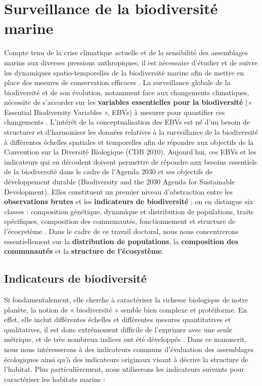 \section{Surveillance de la biodiversité marine}\label{intro.2}

Compte tenu de la crise climatique actuelle et de la sensibilité des assemblages marins aux diverses pressions anthropiques, il est nécessaire d’étudier et de suivre les dynamiques spatio-temporelles de la biodiversité marine afin de mettre en place des mesures de conservation efficaces \citep{magris_integrating_2014, klein_shortfalls_2015}. La surveillance globale de la biodiversité et de son évolution, notamment face aux changements climatiques, nécessite de s’accorder sur les \textbf{variables essentielles pour la biodiversité} (« Essential Biodiversity Variables », EBVs) à mesurer pour quantifier ces changements \citep{pereira_essential_2013, navarro_monitoring_2017, schmeller_operational_2017, haase_next_2018, kissling_building_2018}. L’intérêt de la conceptualisation des EBVs est né d’un besoin de structurer et d’harmoniser les données relatives à la surveillance de la biodiversité à différentes échelles spatiales et temporelles \citep{kissling_building_2018} afin de répondre aux objectifs de la Convention sur la Diversité Biologique (CDB 2010). Aujourd’hui, ces EBVs et les indicateurs qui en découlent doivent permettre de répondre aux besoins essentiels de la biodiversité dans le cadre de l’Agenda 2030 et ses objectifs de développement durable (Biodiversity and the 2030 Agenda for Sustainable Development). Elles constituent un premier niveau d’abstraction entre les \textbf{observations brutes} et les \textbf{indicateurs de biodiversité} ; on en distingue six classes : composition génétique, dynamique et distribution de populations, traits spécifiques, composition des communautés, fonctionnement et structure de l’écosystème \citep{pereira_essential_2013}. Dans le cadre de ce travail doctoral, nous nous concentrerons essentiellement sur la \textbf{distribution de populations}, la \textbf{composition des communautés} et la \textbf{structure de l’écosystème}.

\subsection{Indicateurs de biodiversité}\label{intro.2.1}

Si fondamentalement, elle cherche à caractériser la richesse biologique de notre planète, la notion de « biodiversité » semble bien complexe et protéiforme. En effet, elle inclut différentes échelles et différentes mesures quantitatives et qualitatives, il est donc extrêmement difficile de l’exprimer avec une seule métrique, et de très nombreux indices ont été développés \citep{teixeira_catalogue_2016}. Dans ce manuscrit, nous nous intéresserons à des indicateurs communs d’évaluation des assemblages écologiques ainsi qu’à des indicateurs originaux visant à décrire la structure de l’habitat. Plus particulièrement, nous utiliserons les indicateurs suivants pour caractériser les habitats marins :

